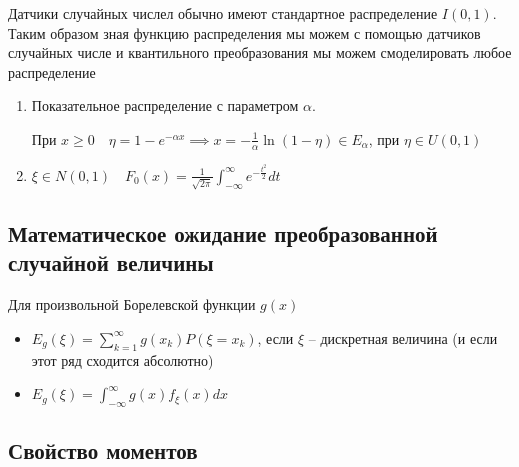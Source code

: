 \begin{note}
    Датчики случайных числел обычно имеют стандартное распределение $I\left( 0,1 \right) $. Таким образом зная функцию распределения мы можем с помощью датчиков случайных числе и квантильного преобразования мы можем смоделировать любое распределение
\end{note}

\begin{example}
    \begin{enumerate}
        \item Показательное распределение с параметром $\alpha$.

            При $x\geqslant 0\quad \eta = 1-e^{-\alpha x} \implies x = -\frac{1}{\alpha}\ln \left( 1-\eta \right) \in E_\alpha$, при $\eta\in U\left( 0,1 \right) $ 
        \item $\xi\in N\left( 0,1 \right) \quad F_0(x) = \frac{1}{\sqrt{2\pi } }\int_{-\infty }^{\infty }e^{-\frac{t^2}{2}}dt$
    \end{enumerate}
\end{example}

\subsection{Математическое ожидание преобразованной случайной величины}

\begin{theorem}

    Для произвольной Борелевской функции $g(x)$
     \begin{itemize}
         \item $E_g(\xi) = \sum_{k=1}^{\infty }g(x_k)P\left( \xi = x_k \right) $, если $\xi$ -- дискретная величина (и если этот ряд сходится абсолютно)
         \item  $E_g(\xi) = \int_{-\infty }^{\infty }g(x)f_\xi(x)dx$
    \end{itemize}
\end{theorem}

\subsection{Свойство моментов}

